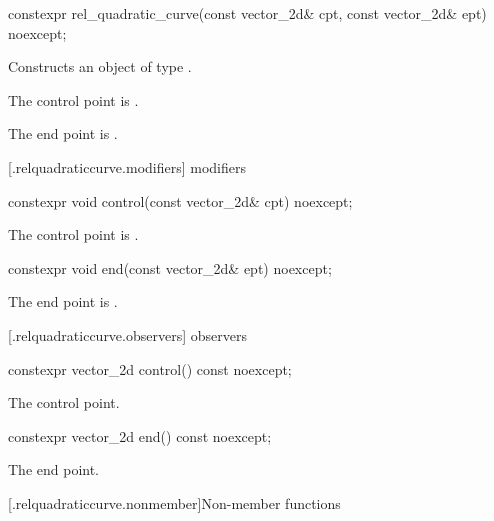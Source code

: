 %
\begin{itemdecl}
constexpr rel_quadratic_curve(const vector_2d& cpt, const vector_2d& ept)
  noexcept;
\end{itemdecl}
\begin{itemdescr}
\pnum
\effects
Constructs an object of type .

\pnum
The control point is .

\pnum
The end point is .
\end{itemdescr}

 [\iotwod.relquadraticcurve.modifiers]{ modifiers}%

%
\begin{itemdecl}
constexpr void control(const vector_2d& cpt) noexcept;
\end{itemdecl}
\begin{itemdescr}
\pnum
\effects
The control point is .
\end{itemdescr}

%
\begin{itemdecl}
constexpr void end(const vector_2d& ept) noexcept;
\end{itemdecl}
\begin{itemdescr}
\pnum
\effects
The end point is .
\end{itemdescr}

 [\iotwod.relquadraticcurve.observers]{ observers}%

%
\begin{itemdecl}
constexpr vector_2d control() const noexcept;
\end{itemdecl}
\begin{itemdescr}
\pnum
\returns
The control point.
\end{itemdescr}

%
\begin{itemdecl}
constexpr vector_2d end() const noexcept;
\end{itemdecl}
\begin{itemdescr}
\pnum
\returns
The end point.
\end{itemdescr}

 [\iotwod.relquadraticcurve.nonmember]{Non-member functions}%

